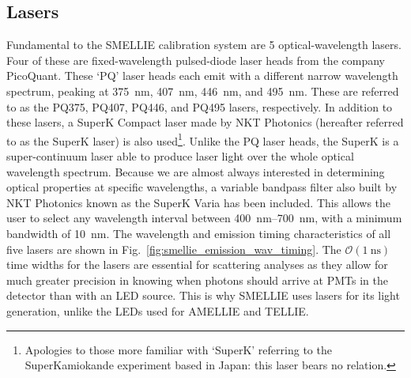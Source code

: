 \subsection{Lasers}\label{sec:smellie_lasers}
Fundamental to the SMELLIE calibration system are 5 optical-wavelength lasers. Four of these are fixed-wavelength pulsed-diode laser heads from the company PicoQuant. These `PQ' laser heads each emit with a different narrow wavelength spectrum, peaking at \SI{375}{\nm}, \SI{407}{\nm}, \SI{446}{\nm}, and \SI{495}{\nm}. These are referred to as the PQ375, PQ407, PQ446, and PQ495 lasers, respectively. In addition to these lasers, a SuperK Compact laser made by NKT Photonics (hereafter referred to as the SuperK laser) is also used\footnote{
    Apologies to those more familiar with `SuperK' referring to the SuperKamiokande experiment based in Japan: this laser bears no relation.
}. Unlike the PQ laser heads, the SuperK is a super-continuum laser able to produce laser light over the whole optical wavelength spectrum. Because we are almost always interested in determining optical properties at specific wavelengths, a variable bandpass filter also built by NKT Photonics known as the SuperK Varia has been included. This allows the user to select any wavelength interval between \SIrange{400}{700}{\nm}, with a minimum bandwidth of \SI{10}{\nm}. The wavelength and emission timing characteristics of all five lasers are shown in Fig.~\ref{fig:smellie_emission_wav_timing}. The $\mathcal{O}(\SI{1}{\ns})$ time widths for the lasers are essential for scattering analyses as they allow for much greater precision in knowing when photons should arrive at PMTs in the detector than with an LED source. This is why SMELLIE uses lasers for its light generation, unlike the LEDs used for AMELLIE and TELLIE.

